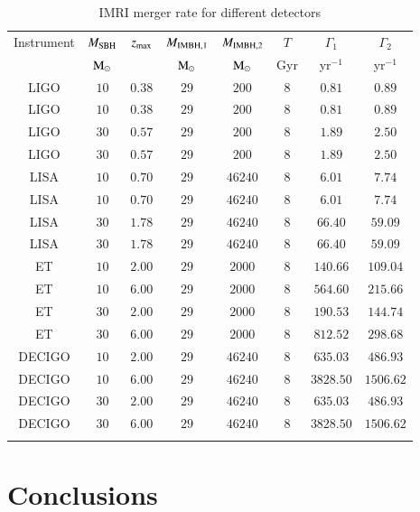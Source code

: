 \documentclass[article]{aa}
\newcommand{\Ms}{{\rm M}_\odot}
\newcommand{\ibh}{{\rm IMBH}}
\begin{document}
\begin{table}
\caption{IMRI merger rate for different detectors }
\begin{center}
\begin{tabular}{cccccccc}
\hline
Instrument & $M_{\rm SBH}$ & $z_{\rm max}$ & $M_{\ibh ,1}$ & $M_{\ibh ,2}$ & $T$ & $\Gamma_1$ & $\Gamma_2$ \\
   & $\Ms$ & &$\Ms$ & $\Ms$ & Gyr & yr$^{-1}$ & yr$^{-1}$ \\ 
\hline
LIGO & $10$ & $0.38$ & $29$ & $200$ & $8$ & $0.81$ &$0.89$ \\
LIGO & $10$ & $0.38$ & $29$ & $200$ & $8$ & $0.81$ &$0.89$ \\
LIGO & $30$ & $0.57$ & $29$ & $200$ & $8$ & $1.89$ &$2.50$ \\
LIGO & $30$ & $0.57$ & $29$ & $200$ & $8$ & $1.89$ &$2.50$ \\
LISA & $10$ & $0.70$ & $29$ & $46240$ & $8$ & $6.01$ &$7.74$ \\
LISA & $10$ & $0.70$ & $29$ & $46240$ & $8$ & $6.01$ &$7.74$ \\
LISA & $30$ & $1.78$ & $29$ & $46240$ & $8$ & $66.40$ &$59.09$ \\
LISA & $30$ & $1.78$ & $29$ & $46240$ & $8$ & $66.40$ &$59.09$ \\
ET & $10$ & $2.00$ & $29$ & $2000$ & $8$ & $140.66$ &$109.04$ \\
ET & $10$ & $6.00$ & $29$ & $2000$ & $8$ & $564.60$ &$215.66$ \\
ET & $30$ & $2.00$ & $29$ & $2000$ & $8$ & $190.53$ &$144.74$ \\
ET & $30$ & $6.00$ & $29$ & $2000$ & $8$ & $812.52$ &$298.68$ \\
DECIGO & $10$ & $2.00$ & $29$ & $46240$ & $8$ & $635.03$ &$486.93$ \\
DECIGO & $10$ & $6.00$ & $29$ & $46240$ & $8$ & $3828.50$ &$1506.62$ \\
DECIGO & $30$ & $2.00$ & $29$ & $46240$ & $8$ & $635.03$ &$486.93$ \\
DECIGO & $30$ & $6.00$ & $29$ & $46240$ & $8$ & $3828.50$ &$1506.62$ \\
\hline
\label{tab:5}
\end{tabular}
\end{center}
\end{table}








\section{Conclusions}
\end{document}
